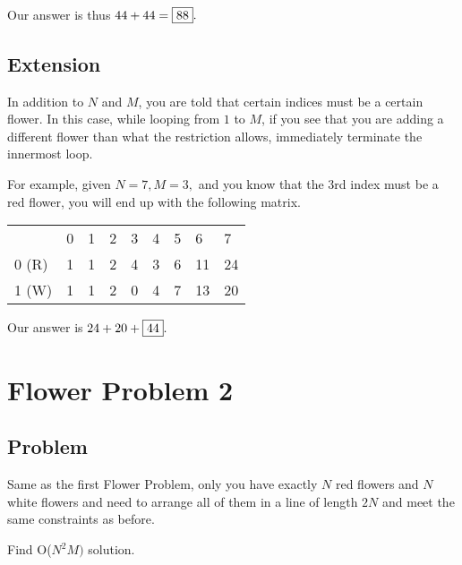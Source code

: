 \documentclass{article}
\begin{document}
Our answer is thus $44 + 44 = \fbox{88}.$

\subsection{Extension}
In addition to $N$ and $M$, you are told that certain indices must be a certain flower. In this case, while looping from $1$ to $M$, if you see that you are adding a different flower than what the restriction allows, immediately terminate the innermost loop.

For example, given $N = 7, M = 3,$ and you know that the 3rd index must be a red flower, you will end up with the following matrix.

\begin{table}[h]
\begin{tabular}{lllllllll}
                           & 0                      & 1                      & 2                      & 3                      & 4                      & 5                      & 6                       & 7                       \\ \cline{2-9} 
\multicolumn{1}{l|}{0 (R)} & \multicolumn{1}{l|}{1} & \multicolumn{1}{l|}{1} & \multicolumn{1}{l|}{2} & \multicolumn{1}{l|}{4} & \multicolumn{1}{l|}{3} & \multicolumn{1}{l|}{6} & \multicolumn{1}{l|}{11} & \multicolumn{1}{l|}{24} \\ \cline{2-9} 
\multicolumn{1}{l|}{1 (W)} & \multicolumn{1}{l|}{1} & \multicolumn{1}{l|}{1} & \multicolumn{1}{l|}{2} & \multicolumn{1}{l|}{0} & \multicolumn{1}{l|}{4} & \multicolumn{1}{l|}{7} & \multicolumn{1}{l|}{13} & \multicolumn{1}{l|}{20} \\ \cline{2-9} 
\end{tabular}
\end{table}

Our answer is $24 + 20 + \fbox{44}.$

\section{Flower Problem 2}
\subsection{Problem}
Same as the first Flower Problem, only you have exactly $N$ red flowers and $N$ white flowers and need to arrange all of them in a line of length $2N$ and meet the same constraints as before.

Find O($N^{2}M)$ solution.
\end{document}
